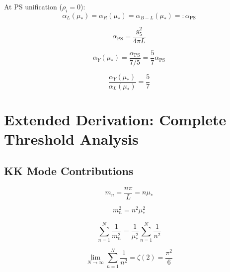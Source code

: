 \documentclass[11pt,a4paper]{article}
\theoremstyle{definition}
\begin{document}
At PS unification ($\rho_i = 0$):
\begin{equation}
\label{eq:unif_1}
\alpha_L(\mu_*) = \alpha_R(\mu_*) = \alpha_{B-L}(\mu_*) =: \alpha_{\text{PS}}
\end{equation}

\begin{equation}
\label{eq:unif_2}
\alpha_{\text{PS}} = \frac{g_5^2}{4\pi L}
\end{equation}

\begin{equation}
\label{eq:unif_3}
\alpha_Y(\mu_*) = \frac{\alpha_{\text{PS}}}{7/5} = \frac{5}{7}\alpha_{\text{PS}}
\end{equation}

\begin{equation}
\label{eq:unif_4}
\frac{\alpha_Y(\mu_*)}{\alpha_L(\mu_*)} = \frac{5}{7}
\end{equation}

\section{Extended Derivation: Complete Threshold Analysis}
\label{app:threshold_complete}

\subsection{KK Mode Contributions}
\label{subsec:kk_modes}

\begin{equation}
\label{eq:kk_mass_1}
m_n = \frac{n\pi}{L} = n\mu_*
\end{equation}

\begin{equation}
\label{eq:kk_mass_2}
m_n^2 = n^2 \mu_*^2
\end{equation}

\begin{equation}
\label{eq:kk_sum_1}
\sum_{n=1}^{N}\frac{1}{m_n^2} = \frac{1}{\mu_*^2}\sum_{n=1}^{N}\frac{1}{n^2}
\end{equation}

\begin{equation}
\label{eq:kk_sum_2}
\lim_{N\to\infty}\sum_{n=1}^{N}\frac{1}{n^2} = \zeta(2) = \frac{\pi^2}{6}
\end{equation}
\end{document}
